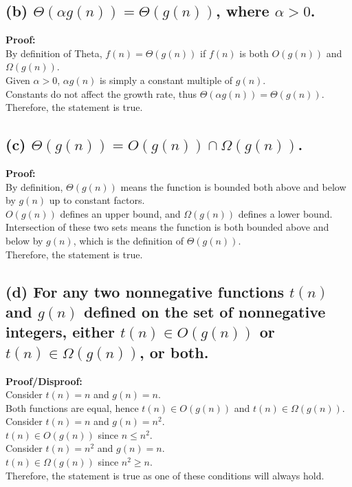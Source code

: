 \subsection*{(b) \(\Theta(\alpha g(n)) = \Theta(g(n))\), where \(\alpha > 0\).}
\textbf{Proof:} \\
By definition of Theta, \( f(n) = \Theta(g(n)) \) if \( f(n) \) is both \( O(g(n)) \) and \( \Omega(g(n)) \). \\
Given \( \alpha > 0 \), \( \alpha g(n) \) is simply a constant multiple of \( g(n) \). \\
Constants do not affect the growth rate, thus \( \Theta(\alpha g(n)) = \Theta(g(n)) \). \\
Therefore, the statement is true.

\subsection*{(c) \(\Theta(g(n)) = O(g(n)) \cap \Omega(g(n))\).}
\textbf{Proof:} \\
By definition, \( \Theta(g(n)) \) means the function is bounded both above and below by \( g(n) \) up to constant factors. \\
\( O(g(n)) \) defines an upper bound, and \( \Omega(g(n)) \) defines a lower bound. \\
Intersection of these two sets means the function is both bounded above and below by \( g(n) \), which is the definition of \( \Theta(g(n)) \). \\
Therefore, the statement is true.

\subsection*{(d) For any two nonnegative functions \( t(n) \) and \( g(n) \) defined on the set of nonnegative integers, either \( t(n) \in O(g(n)) \) or \( t(n) \in \Omega(g(n)) \), or both.}
\textbf{Proof/Disproof:} \\
Consider \( t(n) = n \) and \( g(n) = n \). \\
Both functions are equal, hence \( t(n) \in O(g(n)) \) and \( t(n) \in \Omega(g(n)) \). \\
Consider \( t(n) = n \) and \( g(n) = n^2 \). \\
\( t(n) \in O(g(n)) \) since \( n \leq n^2 \). \\
Consider \( t(n) = n^2 \) and \( g(n) = n \). \\
\( t(n) \in \Omega(g(n)) \) since \( n^2 \geq n \). \\
Therefore, the statement is true as one of these conditions will always hold.

